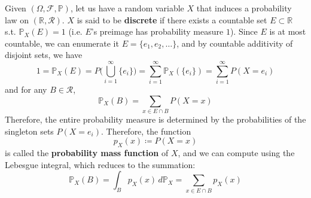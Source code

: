     \begin{definition}
      Given $(\Omega, \mathcal{F}, \mathbb{P})$, let us have a random variable $X$ that induces a probability law on $(\mathbb{R}, \mathcal{R})$. $X$ is said to be \textbf{discrete} if there exists a countable set $E \subset \mathbb{R}$ s.t. $\mathbb{P}_X (E) = 1$ (i.e. $E$'s preimage has probability measure $1$). Since $E$ is at most countable, we can enumerate it $E = \{e_1, e_2, \ldots\}$, and by countable additivity of disjoint sets, we have 
      \begin{equation}
        1 = \mathbb{P}_X (E) = P\bigg( \bigcup_{i=1}^\infty \{e_i\} \bigg) = \sum_{i=1}^\infty \mathbb{P}_X (\{e_i\}) = \sum_{i=1}^\infty P(X = e_i)
      \end{equation}
      and for any $B \in \mathcal{R}$, 
      \begin{equation}
        \mathbb{P}_X (B) = \sum_{x \in E \cap B} P(X = x)
      \end{equation}
      Therefore, the entire probability measure is determined by the probabilities of the singleton sets $P(X = e_i)$. Therefore, the function 
      \begin{equation}
        p_X (x) \coloneqq P(X = x)
      \end{equation}
      is called the \textbf{probability mass function} of $X$, and we can compute using the Lebesgue integral, which reduces to the summation: 
      \begin{equation}
        \mathbb{P}_X (B) = \int_B p_X (x) \, d \mathbb{P}_X = \sum_{x \in E \cap B} p_X (x)
      \end{equation}
    \end{definition}

